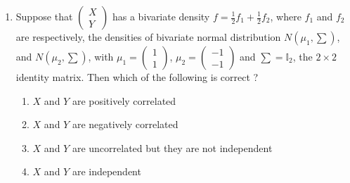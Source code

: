 \documentclass[journal,12pt,twocolumn]{IEEEtran}
\begin{document}
\begin{enumerate}[label=\arabic*.,ref=\theenumi]
\item Suppose that $\begin{pmatrix} X\\ Y \end{pmatrix}$ has a bivariate density $f = \frac{1}{2}f_1 + \frac{1}{2}f_2$, where $f_1$ and $f_2$ are respectively, the densities of bivariate normal distribution $N(\mu_{1},\sum)$, and $N(\mu_{2},\sum)$, with $\mu_{1} = \begin{pmatrix} 1 \\ 1 \end{pmatrix}$, $\mu_{2} = \begin{pmatrix} -1 \\ -1 \end{pmatrix}$ and $\sum = \mathbb{I}_{2}$, the $2 \times 2$ identity matrix. Then which of the following is correct ?
\begin{enumerate}
\item$X$ and $Y$ are positively correlated
\item $X$ and $Y$ are negatively correlated
\item $X$ and $Y$ are uncorrelated but they are not independent
\item $X$ and $Y$ are independent
\end{enumerate}
\end{enumerate}
\end{document}
